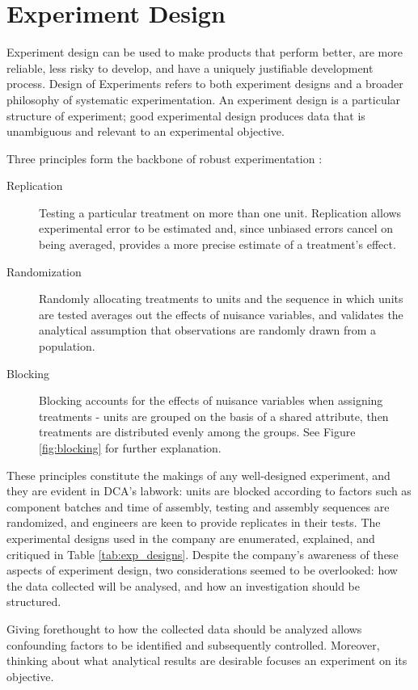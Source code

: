 \documentclass[11pt,a4paper,article]{memoir} %
\begin{document}
\section{Experiment Design}
Experiment design can be used to make products that perform better, are more reliable, less risky to develop, and have a uniquely justifiable development process. Design of Experiments refers to both experiment designs and a broader philosophy of systematic experimentation. An experiment design is a particular structure of experiment; good experimental design produces data that is unambiguous and relevant to an experimental objective.
\par
Three principles form the backbone of robust experimentation \cite{montgomery2000design}:
\begin{description}
\item[Replication]{Testing a particular treatment on more than one unit. Replication allows experimental error to be estimated and, since unbiased errors cancel on being averaged, provides a more precise estimate of a treatment's effect.}
\item[Randomization]{Randomly allocating treatments to units and the sequence in which units are tested averages out the effects of nuisance variables, and validates the analytical assumption that observations are randomly drawn from a population.}
\item[Blocking]{Blocking accounts for the effects of nuisance variables when assigning treatments - units are grouped on the basis of a shared attribute, then treatments are distributed evenly among the groups. See Figure \ref{fig:blocking} for further explanation.}
\end{description}
These principles constitute the makings of any well-designed experiment, and they are evident in DCA's labwork: units are blocked according to factors such as component batches and time of assembly, testing and assembly sequences are randomized, and engineers are keen to provide replicates in their tests. The experimental designs used in the company are enumerated, explained, and critiqued in Table \ref{tab:exp_designs}. Despite the company's awareness of these aspects of experiment design, two considerations seemed to be overlooked: how the data collected will be analysed, and how an investigation should be structured.

Giving forethought to how the collected data should be analyzed allows confounding factors to be identified and subsequently controlled. Moreover, thinking about what analytical results are desirable focuses an experiment on its objective.
\end{document}
